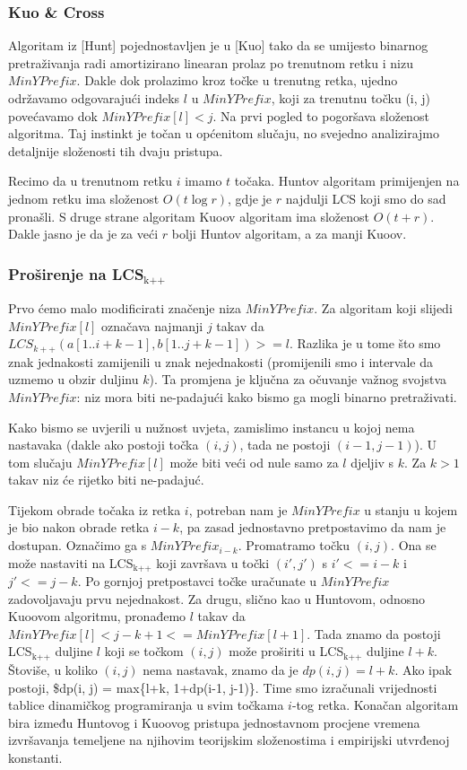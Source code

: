 \documentclass[11pt]{article}
\begin{document}
\subsubsection{Kuo \& Cross}
\label{sec-2-2-2}
Algoritam iz [Hunt] pojednostavljen je u [Kuo] tako da se umijesto
binarnog pretraživanja radi amortizirano linearan prolaz po trenutnom
retku i nizu $MinYPrefix$. Dakle dok prolazimo kroz točke u trenutng 
retka, ujedno održavamo odgovarajući indeks $l$ u $MinYPrefix$, koji
za trenutnu točku (i, j) povećavamo dok $MinYPrefix[l] < j$. 
Na prvi pogled to pogoršava složenost algoritma. Taj instinkt je
točan u općenitom slučaju, no svejedno analizirajmo detaljnije
složenosti tih dvaju pristupa.

Recimo da u trenutnom retku $i$ imamo $t$ točaka. Huntov algoritam
primijenjen na jednom retku ima složenost $O(t \log r)$, gdje je
$r$ najdulji LCS koji smo do sad pronašli. S druge strane algoritam
Kuoov algoritam ima složenost $O(t + r)$. Dakle jasno je da je za
veći $r$ bolji Huntov algoritam, a za manji Kuoov.

\subsubsection{Proširenje na LCS$_{\text{k++}}$}
\label{sec-2-2-3}
Prvo ćemo malo modificirati značenje niza $MinYPrefix$.
Za algoritam koji slijedi $MinYPrefix[l]$ označava najmanji $j$
takav da $LCS_{k++}(a[1..i+k-1], b[1..j+k-1]) >= l$. Razlika je
u tome što smo znak jednakosti zamijenili u znak nejednakosti
(promijenili smo i intervale da uzmemo u obzir duljinu $k$). 
Ta promjena je ključna za očuvanje važnog svojstva $MinYPrefix$:
niz mora biti ne-padajući kako bismo ga mogli binarno pretraživati.

Kako bismo se uvjerili u nužnost uvjeta, zamislimo instancu u kojoj
nema nastavaka (dakle ako postoji točka $(i, j)$, tada ne postoji
$(i-1, j-1)$). U tom slučaju $MinYPrefix[l]$ može biti veći od
nule samo za $l$ djeljiv s $k$. Za $k > 1$ takav niz će rijetko
biti ne-padajuć.

Tijekom obrade točaka iz retka $i$, potreban nam je $MinYPrefix$ u
stanju u kojem je bio nakon obrade retka $i-k$, pa zasad
jednostavno pretpostavimo da nam je dostupan. Označimo ga s
$MinYPrefix_{i-k}$. Promatramo točku $(i, j)$. Ona se može
nastaviti na LCS$_{\text{k++}}$ koji završava u točki $(i', j')$ s $i' <=
    i - k$ i $j' <= j - k$. Po gornjoj pretpostavci točke uračunate u
$MinYPrefix$ zadovoljavaju prvu nejednakost. Za drugu, slično kao
u Huntovom, odnosno Kuoovom algoritmu, pronađemo $l$ takav da
$MinYPrefix[l] < j - k + 1 <= MinYPrefix[l+1]$. Tada znamo da
postoji LCS$_{\text{k++}}$ duljine $l$ koji se točkom $(i, j)$ može
proširiti u LCS$_{\text{k++}}$ duljine $l+k$. Štoviše, u koliko $(i, j)$
nema nastavak, znamo da je $dp(i, j) = l+k$.  Ako ipak postoji,
\$dp(i, j) = max\{l+k, 1+dp(i-1, j-1)\}. Time smo izračunali
vrijednosti tablice dinamičkog programiranja u svim točkama
$i$-tog retka. Konačan algoritam bira između Huntovog i Kuoovog
pristupa jednostavnom procjene vremena izvršavanja temeljene na
njihovim teorijskim složenostima i empirijski utvrđenoj konstanti.
\end{document}
